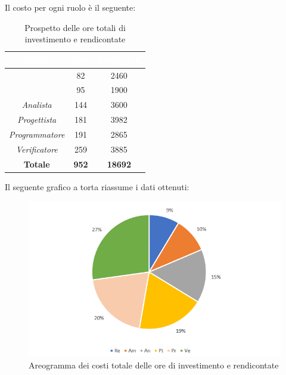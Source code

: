 \newpage
{}
Il costo per ogni ruolo è il seguente:
\begin{table}[H]
	\begin{center}
		\begin{tabular}{ |c c c| }
		\rowcolor{darkblue} 
		\textcolor{white}{\textbf{Ruolo}} & \textcolor{white}{\textbf{Ore}} & \textcolor{white}{\textbf{Costo in €}}\\ \hline
		{\Responsabile} 			& 82 	& 2460 \\ \hline
		{\Amministratore} 			& 95 	& 1900 \\ \hline
		\textit{Analista} 			& 144 	& 3600 \\ \hline
		\textit{Progettista} 		& 181 	& 3982 \\ \hline
		\textit{Programmatore}  	& 191 	& 2865 \\ \hline
		\textit{Verificatore} 		& 259 	& 3885 \\ \hline
		\textbf{Totale} & \textbf{952} & \textbf{18692} \\  \hline
		\end{tabular}
	\caption{Prospetto delle ore totali di investimento e rendicontate}
	\end{center}
\end{table}
Il seguente grafico a torta riassume i dati ottenuti:
\begin{figure}[H]
    \centering
    \includegraphics[scale = 0.75]{Immagini/TotaleTorta.png}
    \caption{ Areogramma dei costi totale delle ore di investimento e rendicontate}
    \label{fig:areogramma ripartizione ore totali di investimento e rendicontate}
\end{figure}
\newpage

